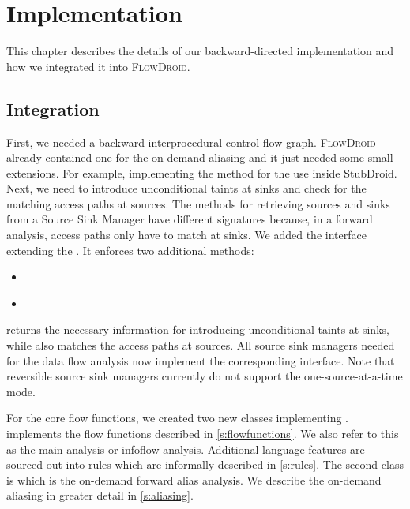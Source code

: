 \documentclass[../draft.tex]{subfiles}
\begin{document}
    \chapter{Implementation}
    This chapter describes the details of our backward-directed implementation and how we integrated it into \textsc{FlowDroid}.

    \section{Integration}    
    First, we needed a backward interprocedural control-flow graph. 
    \textsc{FlowDroid} already contained one for the on-demand aliasing and it just needed some small extensions. 
    For example, implementing the  method for the use inside StubDroid.
    Next, we need to introduce unconditional taints at sinks and check for the matching access paths at sources.
    The methods for retrieving sources and sinks from a Source Sink Manager have different signatures because, in a forward analysis, access paths only have to match at sinks. 
    We added the interface  extending the . 
    It enforces two additional methods:
    \begin{itemize}
        \item {}\\
        \item {}\\
    \end{itemize}
     returns the necessary information for introducing unconditional taints at sinks, while  also matches the access paths at sources.
    All source sink managers needed for the data flow analysis now implement the corresponding interface.
    Note that reversible source sink managers currently do not support the one-source-at-a-time mode.

    For the core flow functions, we created two new classes implementing . 
     implements the flow functions described in \autoref{s:flowfunctions}. 
    We also refer to this as the main analysis or infoflow analysis\footnotemark{}.
    Additional language features are sourced out into rules which are informally described in \autoref{s:rules}. 
    The second class is  which is the on-demand forward alias analysis. 
    We describe the on-demand aliasing in greater detail in \autoref{s:aliasing}.
\end{document}
